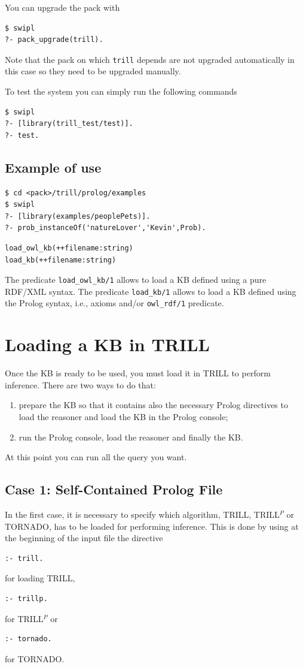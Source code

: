 \documentclass[a4paper,10pt]{scrartcl}
\begin{document}
You can upgrade the pack with
\begin{verbatim}
$ swipl
?- pack_upgrade(trill).
\end{verbatim}
Note that the pack on which \verb|trill| depends are not upgraded automatically in this case so they need to be upgraded manually.

To test the system you can simply run the following commands
\begin{verbatim}
$ swipl
?- [library(trill_test/test)].
?- test.
\end{verbatim}

\subsection{Example of use}
\begin{verbatim}
$ cd <pack>/trill/prolog/examples
$ swipl
?- [library(examples/peoplePets)].
?- prob_instanceOf('natureLover','Kevin',Prob).
\end{verbatim}
	





\begin{verbatim}
load_owl_kb(++filename:string)
load_kb(++filename:string)
\end{verbatim}
The predicate \verb|load_owl_kb/1| allows to load a KB defined using a pure RDF/XML syntax. The predicate \verb|load_kb/1| allows to load a KB defined using the Prolog syntax, i.e., axioms and/or \verb|owl_rdf/1| predicate.

\section{Loading a KB in TRILL}
Once the KB is ready to be used, you must load it in TRILL to perform inference. There are two ways to do that:
\begin{enumerate}
	\item prepare the KB so that it contains also the necessary Prolog directives to load the reasoner and load the KB in the Prolog console;
	\item run the Prolog console, load the reasoner and finally the KB.
\end{enumerate}
At this point you can run all the query you want.

\subsection{Case 1: Self-Contained Prolog File}
In the first case, it is necessary to specify which algorithm, TRILL, TRILL$^P$ or TORNADO, has to be loaded for performing inference. This is done by using at the beginning of the input file the directive
\begin{verbatim}
:- trill.
\end{verbatim}
for loading TRILL,
\begin{verbatim}
:- trillp.
\end{verbatim}
for TRILL$^P$ or
\begin{verbatim}
:- tornado.
\end{verbatim}
for TORNADO.
\end{document}
